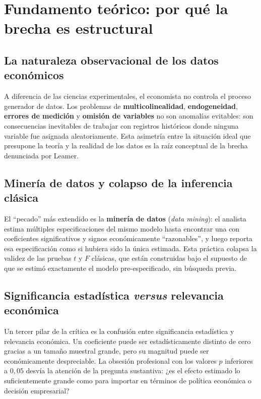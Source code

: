 \documentclass[12pt, letterpaper]{article}
\begin{document}
\section{Fundamento teórico: por qué la brecha es estructural}

\subsection{La naturaleza observacional de los datos económicos}

A diferencia de las ciencias experimentales, el economista no controla el
proceso generador de datos. Los problemas de \textbf{multicolinealidad},
\textbf{endogeneidad}, \textbf{errores de medición} y
\textbf{omisión de variables} no son anomalías evitables: son consecuencias
inevitables de trabajar con registros históricos donde ninguna variable
fue asignada aleatoriamente. Esta asimetría entre la situación ideal que
presupone la teoría y la realidad de los datos es la raíz conceptual de
la brecha denunciada por Leamer.

\subsection{Minería de datos y colapso de la inferencia clásica}

El ``pecado'' más extendido es la \textbf{minería de datos}
(\textit{data mining}): el analista estima múltiples especificaciones
del mismo modelo hasta encontrar una con coeficientes significativos
y signos económicamente ``razonables'', y luego reporta esa
especificación como si hubiera sido la única estimada. Esta práctica
colapsa la validez de las pruebas $t$ y $F$ clásicas, que están
construidas bajo el supuesto de que se estimó exactamente el modelo
pre-especificado, sin búsqueda previa.

\subsection{Significancia estadística \textit{versus} relevancia económica}

Un tercer pilar de la crítica es la confusión entre significancia
estadística y relevancia económica. Un coeficiente puede ser
estadísticamente distinto de cero gracias a un tamaño muestral
grande, pero su magnitud puede ser económicamente despreciable. La
obsesión profesional con los valores $p$ inferiores a $0{,}05$ desvía
la atención de la pregunta sustantiva: ¿es el efecto estimado lo
suficientemente grande como para importar en términos de política
económica o decisión empresarial?
\end{document}
